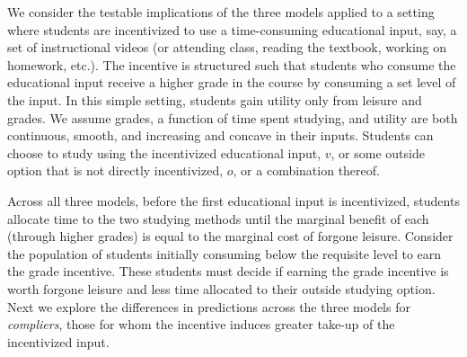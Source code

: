 \documentclass[12pt]{article}
\begin{document}
We consider the testable implications of the three models applied to a setting where students are incentivized to use a time-consuming educational input, say, a set of instructional videos (or attending class, reading the textbook, working on homework, etc.). The incentive is structured such that students who consume the educational input receive a higher grade in the course by consuming a set level of the input. In this simple setting, students gain utility only from leisure and grades. We assume grades, a function of time spent studying, and utility are both continuous, smooth, and increasing and concave in their inputs. Students can choose to study using the incentivized educational input, $v$, or some outside option that is not directly incentivized, $o$, or a combination thereof.

Across all three models, before the first educational input is incentivized, students allocate time to the two studying methods until the marginal benefit of each (through higher grades) is equal to the marginal cost of forgone leisure. Consider the population of students initially consuming below the requisite level to earn the grade incentive. These students must decide if earning the grade incentive is worth forgone leisure and less time allocated to their outside studying option. Next we explore the differences in predictions across the three models for \textit{compliers}, those for whom the incentive induces greater take-up of the incentivized input.

\end{document}
